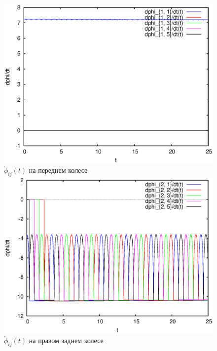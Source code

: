 \begin{figure}[H]
    \begin{columns}
            \centering
            \includegraphics[width=\linewidth]{pic/rol__straight__velocities_of_rollers_of_wheel_1}\\
            $\dot{\phi}_{ij}(t)$ на переднем колесе
            \centering
            \includegraphics[width=\linewidth]{pic/rol__straight__velocities_of_rollers_of_wheel_2}\\
            $\dot{\phi}_{ij}(t)$ на правом заднем колесе
    \end{columns}

\end{figure}
